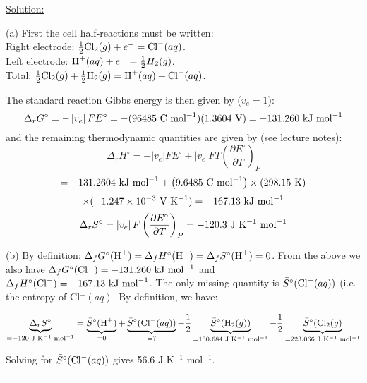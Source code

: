 \noindent
\underline{Solution:}

(a) First the cell half-reactions must be written:\\
Right electrode: $\frac{1}{2}\textnormal{Cl}_2(g) + e^- = \textnormal{Cl}^-(aq)$.\\
Left electrode: $\textnormal{H}^+(aq) + e^- = \frac{1}{2}H_2(g)$.\\
Total: $\frac{1}{2}\textnormal{Cl}_2(g) + \frac{1}{2}\textnormal{H}_2(g) = \textnormal{H}^+(aq) + \textnormal{Cl}^-(aq)$.

The standard reaction Gibbs energy is then given by ($v_e = 1$):
$$\Delta_r G^\circ = -\left|v_e\right|FE^\circ = -(96485\textnormal{ C mol}^{-1})(1.3604\textnormal{ V}) = -131.260\textnormal{ kJ mol}^{-1}$$
and the remaining thermodynamic quantities are given by (see lecture notes):
$$\Delta_rH^\circ = -\left|v_e\right|FE^\circ + \left|v_e\right|FT\left(\frac{\partial E^\circ}{\partial T}\right)_P$$
$$ = -131.2604\textnormal{ kJ mol}^{-1} + \left(9.6485\textnormal{ C mol}^{-1}\right)\times (298.15\textnormal{ K})$$
$$\times(-1.247\times 10^{-3}\textnormal{ V K}^{-1}) = -167.13\textnormal{ kJ mol}^{-1}$$
$$\Delta_rS^\circ = \left|v_e\right|F\left(\frac{\partial E^\circ}{\partial T}\right)_P = -120.3\textnormal{ J K}^{-1}\textnormal{ mol}^{-1}$$

(b) By definition: $\Delta_fG^\circ(\textnormal{H}^+) = \Delta_fH^\circ(\textnormal{H}^+) = \Delta_fS^\circ(\textnormal{H}^+) = 0$. From the above we also have $\Delta_fG^\circ(\textnormal{Cl}^-) = -131.260\textnormal{ kJ mol}^{-1}$ and $\Delta_fH^\circ(\textnormal{Cl}^-) = -167.13\textnormal{ kJ mol}^{-1}$. The only missing quantity is $\bar{S}^\circ(\textnormal{Cl}^-(aq))$ (i.e. the entropy of Cl$^-(aq)$. By definition, we have:

$$\mathop {\underbrace{\Delta_rS^\circ}}\limits_{=-120\textnormal{ J K}^{-1}\textnormal{ mol}^{-1}} = \mathop {\underbrace{\bar{S}^\circ(\textnormal{H}^+)}}\limits_{=0} + \mathop {\underbrace{\bar{S}^\circ(\textnormal{Cl}^-(aq))}}\limits_{=?} - \frac{1}{2}\mathop {\underbrace{\bar{S}^\circ(\textnormal{H}_2(g))}}\limits_{=130.684\textnormal{ J K}^{-1}\textnormal{ mol}^{-1}} - \frac{1}{2}\mathop {\underbrace{\bar{S}^\circ(\textnormal{Cl}_2(g)}}\limits_{=223.066\textnormal{ J K}^{-1}\textnormal{ mol}^{-1}}$$

Solving for $\bar{S}^\circ(\textnormal{Cl}^-(aq))$ gives 56.6 J K$^{-1}$ mol$^{-1}$.

\hrule\vspace{0.5cm}
